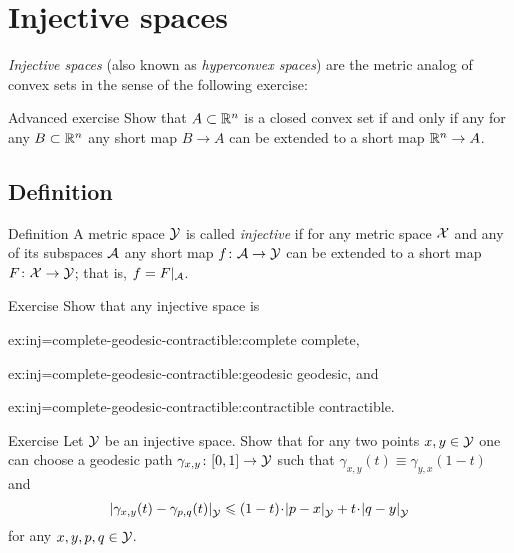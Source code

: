 \chapter{Injective spaces}

\textit{Injective spaces} (also known as \textit{hyperconvex spaces}) are the metric analog of convex sets in the sense of the following exercise:

\begin{thm}{Advanced exercise}\label{ex:conv-short}
Show that $A\subset \mathbb{R}^n$ is a closed convex set if and only if
any for any  $B\subset \mathbb{R}^n$ any short map $B\to A$ can be extended to a short map $\mathbb{R}^n\to A$.
\end{thm}

\section{Definition}

\begin{thm}{Definition}\label{def:injective}
A metric space $\mathcal{Y}$ is called \emph{injective} if for any metric space $\mathcal{X}$ and any of its subspaces $\mathcal{A}$
any short map $f\colon\mathcal{A}\to \mathcal{Y}$ can be extended to a short map $F\colon\mathcal{X}\to \mathcal{Y}$;
that is, $f=F|_{\mathcal{A}}$.
\end{thm}

\begin{thm}{Exercise}\label{ex:inj=complete-geodesic-contractible}
Show that any injective space is 
\begin{multicols}{3}

\begin{subthm}{ex:inj=complete-geodesic-contractible:complete}
complete,
\end{subthm}

\begin{subthm}{ex:inj=complete-geodesic-contractible:geodesic}
geodesic, and
\end{subthm}

\begin{subthm}{ex:inj=complete-geodesic-contractible:contractible}
contractible.
\end{subthm}

\end{multicols}

\end{thm}

\begin{thm}{Exercise}\label{ex:bicombing}
Let $\mathcal{Y}$ be an injective space.
Show that for any two points $x,y\in \mathcal{Y}$ one can choose a geodesic path $\gamma_{x,y}\colon[0,1]\to \mathcal{Y}$ such that
$\gamma_{x,y}(t)\equiv\gamma_{y,x}(1-t)$ and
\[\dist{\gamma_{x,y}(t)}{\gamma_{p,q}(t)}{\spc{Y}}\le (1-t)\cdot\dist{p}{x}{\spc{Y}}+t\cdot\dist{q}{y}{\spc{Y}}\]
for any $x,y,p,q\in \mathcal{Y}$.
\end{thm}

